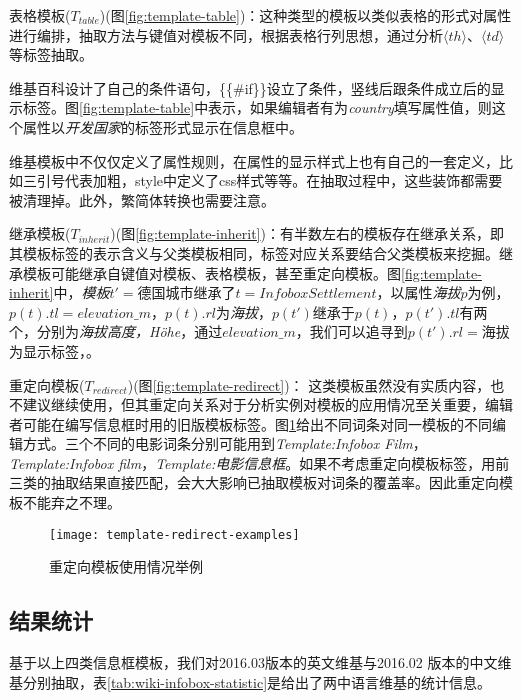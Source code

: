 {\heiti 表格模板($T_{table}$)(图\ref{fig:template-table})：}这种类型的模板以类似表格的形式对属性进行编排，抽取方法与键值对模板不同，根据表格行列思想，通过分析$\langle th\rangle、\langle td\rangle$等标签抽取。

维基百科设计了自己的条件语句，\{\{\#if\}\}设立了条件，竖线后跟条件成立后的显示标签。图\ref{fig:template-table}中表示，如果编辑者有为\textit{country}填写属性值，则这个属性以\textit{开发国家}的标签形式显示在信息框中。

维基模板中不仅仅定义了属性规则，在属性的显示样式上也有自己的一套定义，比如三引号代表加粗，style中定义了css样式等等。在抽取过程中，这些装饰都需要被清理掉。此外，繁简体转换也需要注意。

{\heiti 继承模板($T_{inherit}$)(图\ref{fig:template-inherit})：}有半数左右的模板存在继承关系，即其模板标签的表示含义与父类模板相同，标签对应关系要结合父类模板来挖掘。继承模板可能继承自键值对模板、表格模板，甚至重定向模板。图\ref{fig:template-inherit}中，\textit{模板$t' = 德国城市$}继承了\textit{$t = Infobox Settlement$}，以属性\textit{海拔}$p$为例，$p(t).tl = elevation\_m$，$p(t).rl$为\textit{海拔}，$p(t')$继承于$p(t)$，$p(t').tl$有两个，分别为\textit{海拔高度，Höhe}，通过$elevation\_m$，我们可以追寻到$p(t').rl = 海拔$为显示标签，。

{\heiti 重定向模板($T_{redirect}$)(图\ref{fig:template-redirect})：} 这类模板虽然没有实质内容，也不建议继续使用，但其重定向关系对于分析实例对模板的应用情况至关重要，编辑者可能在编写信息框时用的旧版模板标签。图\ref{fig:template-redirect-examples}给出不同词条对同一模板的不同编辑方式。三个不同的电影词条分别可能用到\textit{Template:Infobox Film}，\textit{Template:Infobox film}，\textit{Template:电影信息框}。如果不考虑重定向模板标签，用前三类的抽取结果直接匹配，会大大影响已抽取模板对词条的覆盖率。因此重定向模板不能弃之不理。


\begin{figure}[ht]
  \centering
  \texttt{[image: template-redirect-examples]}
  \caption{重定向模板使用情况举例}
  \label{fig:template-redirect-examples}
\end{figure}

\subsection{结果统计}

基于以上四类信息框模板，我们对2016.03版本的英文维基与2016.02 版本的中文维基分别抽取，表\ref{tab:wiki-infobox-statistic}是给出了两中语言维基的统计信息。

